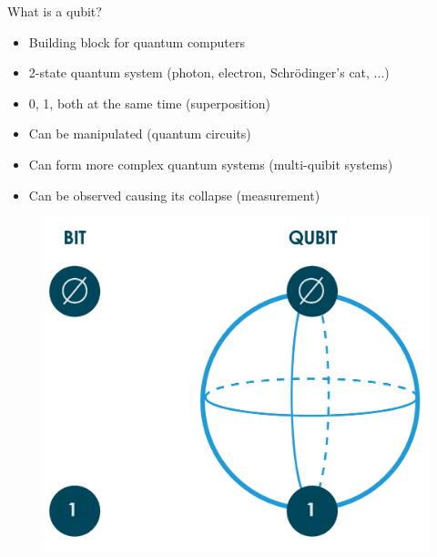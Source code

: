 \begin{frame}{What is a qubit?}

		\begin{itemize}
			\item Building block for quantum computers
			\item 2-state quantum system (photon, electron, Schrödinger's cat, ...)
			\item 0, 1, both at the same time (superposition)
			\item Can be manipulated (quantum circuits)
			\item Can form more complex quantum systems (multi-quibit systems)
			\item Can be observed causing its collapse (measurement)
		\end{itemize}
		
		\begin{figure}[H]
          \centering
            \includegraphics[width=.4\linewidth]{qubit}
        \end{figure}
    
\end{frame}


